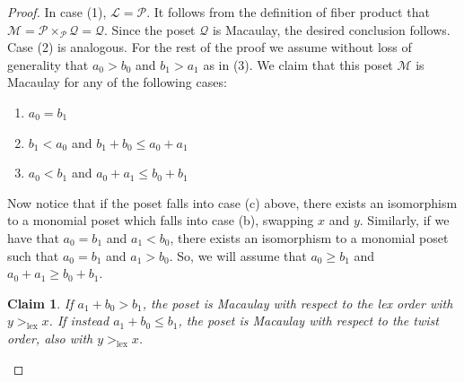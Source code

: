 \documentclass[11pt, reqno]{amsart}
\newcommand{\Q}{{\mathcal Q}}
\renewcommand{\L}{{\mathcal L}}
\newcommand{\M}{{\mathcal M}}
\renewcommand{\P}{{\mathcal P}}
\def\lex{\operatorname{lex}}
\theoremstyle{plain} %
\theoremstyle{definition}
\newtheorem{claim}[thm]{Claim}
\theoremstyle{remark}
\numberwithin{equation}{section}  %
\begin{document}
\begin{proof} In case (1), $\L=\P$. It follows from the definition of fiber product that $\M=\P\times_\P \Q=\Q$. Since the poset $\Q$ is Macaulay, the desired conclusion follows.  Case (2) is analogous. For the rest of the proof we assume without loss of generality that $a_0 > b_0$ and $b_1> a_1$ as in (3). 
We claim that this poset $\M$ is Macaulay for any of the following cases:
\begin{enumerate}
        \item[(a)] $a_0=b_1$
        \item[(b)] $b_1<a_0$ and $b_1+b_0 \leq a_0 + a_1$
        \item[(c)] $a_0<b_1$ and $a_0+a_1 \leq b_0 + b_1$
\end{enumerate}
Now notice that if the poset falls into case (c) above, there exists an isomorphism to  a monomial poset which falls into case (b), swapping $x$ and $y$. Similarly, if we have that $a_0=b_1$ and $a_1<b_0$, there exists an isomorphism  to  a monomial poset such that $a_0=b_1$ and $a_1>b_0$. So, we will assume that $a_0 \geq b_1$ and $a_0+a_1 \geq b_0 + b_1$. 

\begin{claim}\label{claim}
   {\em  If $a_1+b_0 > b_1$,  the poset is Macaulay with respect to the lex order with $y >_{\lex} x$. If instead $a_1+b_0 \leq b_1$, the poset is Macaulay with respect to the twist order, also with $y >_{\lex} x$.}
\end{claim}


\end{proof}
\end{document}
